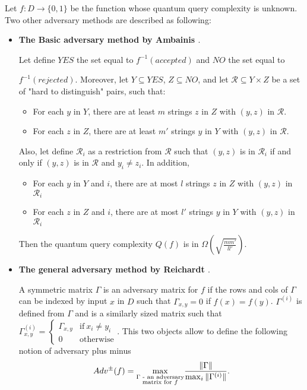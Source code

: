 Let $f:D\to\{0,1\}$ be the function whose quantum query complexity is unknown. Two other adversary methods
are described as following:
\begin{itemize}
    \item \textbf{The Basic adversary method by Ambainis \cite{andris_adversary_methode}}.
          \begin{theorem}
              \label{th:basicadv}
              Let define $YES$ the set equal to $f^{-1}(accepted)$ and $NO$ the set
              equal to

              $f^{-1}(rejected)$. Moreover, let $Y\subseteq YES$, $Z \subseteq NO$, and
              let $\mathcal{R} \subseteq Y\times Z$ be a set of "hard to distinguish" pairs, such that:
              \begin{itemize}
                  \item For each $y$ in $Y$, there are at least $m$ strings $z$ in $Z$ with $(y,z)$ in $\mathcal{R}$.
                  \item For each $z$ in $Z$, there are at least $m'$ strings $y$ in $Y$ with $(y,z)$ in $\mathcal{R}$.
              \end{itemize}
              Also, let define $\mathcal{R}_i$ as a restriction from $\mathcal{R}$ such
              that $(y, z)$ is in $\mathcal{R}_i$ if and only if $(y, z)$ is in $\mathcal{R}$
              and $y_i \neq z_i$.
              In addition,
              \begin{itemize}
                  \item For each $y$ in $Y$ and $i$, there are at most $l$ strings $z$ in $Z$ with $(y,z)$ in $\mathcal{R}_i$
                  \item For each $z$ in $Z$ and $i$, there are at most $l'$ strings $y$ in $Y$ with $(y,z)$ in $\mathcal{R}_i$
              \end{itemize}
              Then the quantum query complexity $Q(f)$ is in  $\Omega(\sqrt{\frac{m m'}{ll'}})$.
          \end{theorem}
    \item \textbf{The general adversary method by Reichardt \cite{Reichardt_2009}}.

          A symmetric matrix $\Gamma$ is an adversary matrix for $f$ if the
          rows and cols of $\Gamma$ can be indexed by input $x$ in $D$ such that
          $\Gamma_{x,y} = 0$ if $f(x) = f(y)$. $\Gamma^{(i)}$ is defined from $\Gamma$
          and is a similarly sized matrix such that $\Gamma^{(i)}_{x,y} = \left\{
              \begin{array}{ll}
                  \Gamma_{x,y} & \textrm{if} \ x_i\neq y_i \\
                  0            & \textrm{otherwise}
              \end{array}
              \right.$. This two objects allow to define the following notion of adversary plus minus
          \[Adv^{\pm}(f) = \underset{\textrm{\shortstack{$\Gamma$ -
                          an adversary\\[-1ex] matrix for $f$}}}{\max} \frac{\Vert \Gamma\Vert }{\max_i \Vert \Gamma^{(i)}\Vert}.
          \]


\end{itemize}
